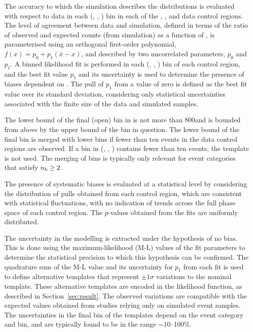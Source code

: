 The accuracy to which the simulation describes the \HTmiss
distributions is evaluated with respect to data in each (\njet, \nb,
\scalht) bin in each of the \mj, \mmj, and \gj data control regions. %
The level of agreement between data and simulation, defined in terms
of the ratio of observed and expected counts (from simulation) as a
function of \HTmiss, is parameterised using an orthogonal first-order
polynomial, $f(x) = p_0 + p_1(\bar{x}-x)$, and described by two
uncorrelated parameters, $p_0$ and $p_1$. A binned likelihood fit is
performed in each (\njet, \nb, \scalht) bin of each control region,
and the best fit value $p_1$ and its uncertainty is used to determine
the presence of biases dependent on \HTmiss. The pull of $p_1$ from a
value of zero is defined as the best fit value over its standard
deviation, considering only statistical uncertainties associated with
the finite size of the data and simulated samples.

The lower bound of the final (open) bin in \HTmiss is not more than
800\GeV and is bounded from above by the upper bound of the \scalht
bin in question. The lower bound of the final \HTmiss bin is merged
with lower bins if fewer than ten events in the data control regions
are observed. If a bin in (\njet, \nb, \scalht) contains fewer than ten
events, the \HTmiss template is not used. The merging of bins is
typically only relevant for event categories that satisfy $n_{\text{b}} \geq
2$.

The presence of systematic biases is evaluated at a statistical level
by considering the distribution of pulls obtained from each control
region, which are consistent with statistical fluctuations, with no
indication of trends across the full phase space of each control
region. The $p$-values obtained from the fits are uniformly
distributed.

The uncertainty in the \HTmiss modelling is extracted under the
hypothesis of no bias. This is done using the maximum-likelihood (M-L)
values of the fit parameters to determine the statistical precision to
which this hypothesis can be confirmed. The quadrature sum of the M-L
value and its uncertainty for $p_1$ from each fit is used to define
alternative templates that represent $\pm1\sigma$ variations to the
nominal \HTmiss template. These alternative templates are encoded in
the likelihood function, as described in Section~\ref{sec:result}. The
observed variations are compatible with the expected values obtained
from studies relying only on simulated event samples. The
uncertainties in the final \HTmiss bin of the templates depend on the
event category and \scalht bin, and are typically found to be in the
range $\sim 10$--100\%.

